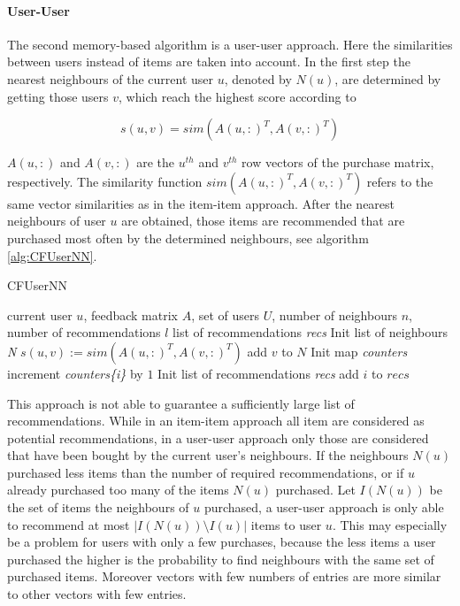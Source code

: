 \documentclass[10pt]{reportMaster}
\begin{document}
\paragraph{User-User}
The second memory-based algorithm is a user-user approach. %
Here the similarities between users instead of items are taken into account.
In the first step the nearest neighbours of the current user $u$, denoted by $N(u)$, are determined by getting those users $v$, which reach the highest score according to

\begin{equation}
	s(u,v) = sim(A(u,:)^T, A(v, :)^T)
\end{equation}

$A(u,:)$ and $A(v,:)$ are the $u^{th}$ and $v^{th}$ row vectors of the purchase matrix, respectively.
The similarity function $sim(A(u,:)^T, A(v, :)^T)$ refers to the same vector similarities as in the item-item approach.
After the nearest neighbours of user $u$ are obtained, those items are recommended that are purchased most often by the determined neighbours, see algorithm \ref{alg:CFUserNN}.

\begin{algorithm}
	\caption{CFUserNN}
	\label{alg:CFUserNN}
	\begin{algorithmic}[1]
		\Require current user $u$, feedback matrix $A$, set of users $U$, number of neighbours $n$, number of recommendations $l$
		\Ensure list of recommendations \textit{recs}
		\State Init list of neighbours \textit{N}
			\State $s(u,v) := sim(A(u,:)^T, A(v,:)^T)$
				\State add $v$ to $N$
			\EndIf
		\EndFor
		\State Init map \textit{counters}
				\State increment \textit{counters\{i\}} by $1$
			\EndFor
		\EndFor
		\State Init list of recommendations \textit{recs}
			\State add $i$ to $recs$
			\EndIf
		\EndFor
	\end{algorithmic}	
\end{algorithm}

This approach is not able to guarantee a sufficiently large list of recommendations.
While in an item-item approach all item are considered as potential recommendations, in a user-user approach only those are considered that have been bought by the current user's neighbours.
If the neighbours $N(u)$ purchased less items than the number of required recommendations, or if $u$ already purchased too many of the items $N(u)$ purchased.
Let $I(N(u))$ be the set of items the neighbours of $u$ purchased, a user-user approach is only able to recommend at most $|I(N(u)) \setminus I(u)|$ items to user $u$.
This may especially be a problem for users with only a few purchases, because the less items a user purchased the higher is the probability to find neighbours with the same set of purchased items.
Moreover vectors with few numbers of entries are more similar to other vectors with few entries.
\end{document}
